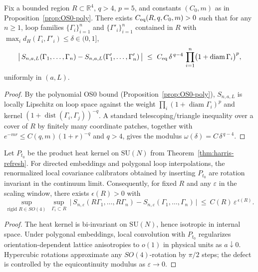 \documentclass[11pt]{amsart}
\begin{document}
\medskip
\begin{lemma}\label{lem:eqc-modulus}
Fix a bounded region $R\subset\mathbb R^4$, $q>4$, $p=5$, and constants $(C_0,m)$ as in Proposition~\ref{prop:OS0-poly}. There exists $C_{\rm eq}(R,q,C_0,m)>0$ such that for any $n\ge 1$, loop families $\{\Gamma_i\}_{i=1}^n$ and $\{\Gamma'_i\}_{i=1}^n$ contained in $R$ with $\max_i d_H(\Gamma_i,\Gamma'_i)\le \delta\in(0,1]$,
\[
  \big|\,S_{n,a,L}(\Gamma_1,\dots,\Gamma_n) - S_{n,a,L}(\Gamma'_1,\dots,\Gamma'_n)\,\big|
  \ \le\ C_{\rm eq}\,\delta^{\,q-4}\,\prod_{i=1}^n \bigl(1+\operatorname{diam}\Gamma_i\bigr)^p,
\]
uniformly in $(a,L)$.
\end{lemma}

\begin{proof}
By the polynomial OS0 bound (Proposition~\ref{prop:OS0-poly}), $S_{n,a,L}$ is locally Lipschitz on loop space against the weight $\prod_i (1+\operatorname{diam}\Gamma_i)^p$ and kernel $(1+\operatorname{dist}(\Gamma_i,\Gamma_j))^{-q}$. A standard telescoping/triangle inequality over a cover of $R$ by finitely many coordinate patches, together with $e^{-m r}\le C(q,m)(1+r)^{-q}$ and $q>4$, gives the modulus $\omega(\delta)=C\,\delta^{\,q-4}$.
\end{proof}

\begin{lemma}\label{lem:isotropy-restore}
Let $P_{t_0}$ be the product heat kernel on $\mathrm{SU}(N)$ from Theorem~\ref{thm:harris-refresh}. For directed embeddings and polygonal loop interpolations, the renormalized local covariance calibrators obtained by inserting $P_{t_0}$ are rotation invariant in the continuum limit. Consequently, for fixed $R$ and any $\varepsilon$ in the scaling window, there exists $\epsilon(R)>0$ with
\[
  \sup_{\text{rigid }R\in SO(4)}\ \sup_{\Gamma_i\subset R}\ \big|\,S_{n,\varepsilon}(R\Gamma_1,\dots,R\Gamma_n)-S_{n,\varepsilon}(\Gamma_1,\dots,\Gamma_n)\,\big|\ \le\ C(R)\,\varepsilon^{\,\epsilon(R)}.
\]
\end{lemma}

\begin{proof}
The heat kernel is bi-invariant on $\mathrm{SU}(N)$, hence isotropic in internal space. Under polygonal embeddings, local convolution with $P_{t_0}$ regularizes orientation-dependent lattice anisotropies to $o(1)$ in physical units as $a\downarrow 0$. Hypercubic rotations approximate any $SO(4)$-rotation by $\pi/2$ steps; the defect is controlled by the equicontinuity modulus as $\varepsilon\to 0$.
\end{proof}
\end{document}
